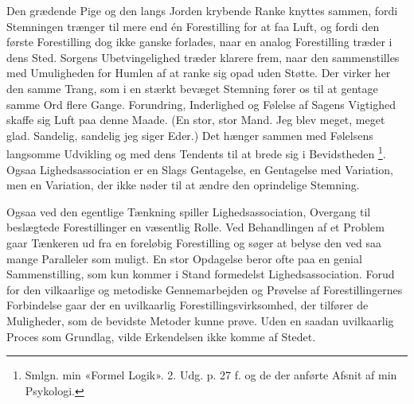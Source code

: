 \documentclass[12pt,a4paper,openany]{book}
\newcommand{\opage}[1]{\marginnote{\footnotesize\textit{[#1]}}}
\begin{document}
Den grædende Pige og den langs Jorden krybende Ranke knyttes sammen, fordi
Stemningen trænger til mere end én Forestilling for at faa Luft, og fordi den
første Forestilling dog ikke ganske forlades, naar en analog Forestilling
træder i dens Sted. Sorgens Ubetvingelighed træder klarere frem, naar den
sammenstilles med Umuligheden for Humlen af at ranke sig opad uden Støtte. Der
virker her den samme Trang, som i en stærkt bevæget Stemning fører os til at
gentage samme Ord flere Gange. Forundring, Inderlighed og Følelse af Sagens
Vigtighed skaffe sig Luft paa denne Maade. (En stor, stor Mand. Jeg blev meget,
meget glad. Sandelig, sandelig jeg siger Eder.) Det hænger sammen med Følelsens
langsomme Udvikling og med dens Tendents til at brede sig i Bevidstheden%
\footnote[2]{Smlgn. min «Formel Logik». 2. Udg. p. 27 f. og de der anførte
Afsnit af min Psykologi.}. Ogsaa Lighedsassociation er en Slags Gentagelse, en
Gentagelse med Variation, men en Variation, der ikke nøder til at ændre den
oprindelige Stemning.

\setcounter{footnote}{0}%
\opage{56}Ogsaa ved den egentlige Tænkning spiller Lighedsassociation, Overgang
til beslægtede Forestillinger en væsentlig Rolle. Ved Behandlingen af et
Problem gaar Tænkeren ud fra en foreløbig Forestilling og søger at belyse den
ved saa mange Paralleler som muligt. En stor Opdagelse beror ofte paa en genial
Sammenstilling, som kun kommer i Stand formedelst Lighedsassociation. Forud for
den vilkaarlige og metodiske Gennemarbejden og Prøvelse af Forestillingernes
Forbindelse gaar der en uvilkaarlig Forestillingsvirksomhed, der tilfører de
Muligheder, som de bevidste Metoder kunne prøve. Uden en saadan uvilkaarlig
Proces som Grundlag, vilde Erkendelsen ikke komme af Stedet.
\end{document}
